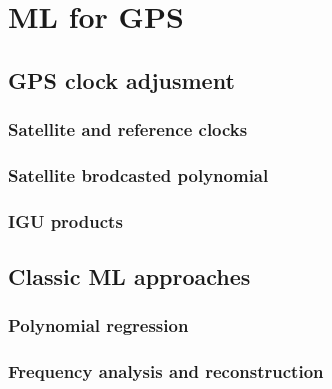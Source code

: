 \setchapterpreamble[u]{\margintoc}
\chapter[Machine learning for GPS clock prediction]{ML for GPS\footnotemark[0]}


\section{GPS clock adjusment}

\subsection{Satellite and reference clocks}

\subsection{Satellite brodcasted polynomial}

\subsection{IGU products}

\section{Classic ML approaches}

\subsection{Polynomial regression}

\subsection{Frequency analysis and reconstruction}

